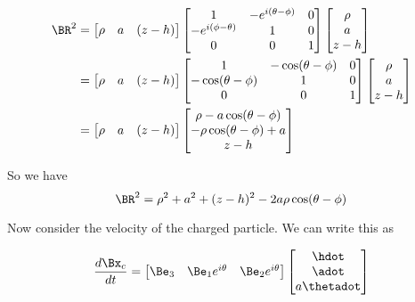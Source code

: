 \begin{align*}
\BR^2 
&=
\begin{bmatrix}
\rho &
a & 
(z - h)
\end{bmatrix}
\begin{bmatrix}
1 & - e^{i(\theta-\phi)} & 0 \\
- e^{i(\phi -\theta)} & 1 & 0 \\
0 & 0 & 1 \\
\end{bmatrix}
\begin{bmatrix}
\rho \\
a \\
z - h
\end{bmatrix} \\
&=
\begin{bmatrix}
\rho &
a & 
(z - h)
\end{bmatrix}
\begin{bmatrix}
1 & - \cos(\theta-\phi) & 0 \\
- \cos(\theta -\phi) & 1 & 0 \\
0 & 0 & 1 \\
\end{bmatrix}
\begin{bmatrix}
\rho \\
a \\
z - h
\end{bmatrix} \\
&=
\begin{bmatrix}
\rho &
a & 
(z - h)
\end{bmatrix}
\begin{bmatrix}
\rho - a \cos(\theta - \phi) \\
- \rho \cos(\theta - \phi) + a \\
z - h
\end{bmatrix}
\end{align*}

So we have
\begin{equation}\label{eqn:matrixVectorPotentials:210}
\BR^2 = \rho^2 + a^2 + (z -h)^2 - 2 a \rho \cos(\theta - \phi)
\end{equation}

Now consider the velocity of the charged particle.  We can write this as

\begin{equation}\label{eqn:matrixVectorPotentials:230}
\frac{d \Bx_c}{dt} = 
\begin{bmatrix}
\Be_3 & \Be_1 e^{i \theta} & \Be_2 e^{i\theta}
\end{bmatrix}
\begin{bmatrix}
\hdot \\
\adot \\
a \thetadot
\end{bmatrix}
\end{equation}


